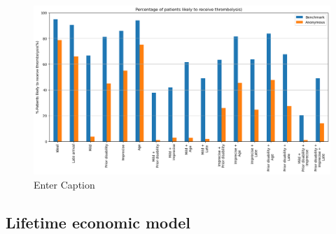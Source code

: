 \begin{figure}
    \centering
    \includegraphics[width=0.75\linewidth]{images/prototype_patients_team_x.png}
    \caption{Enter Caption}
    \label{fig:thrombolysis_rates_prototype_patients_team_x}
\end{figure}

\subsection{Lifetime economic model}





